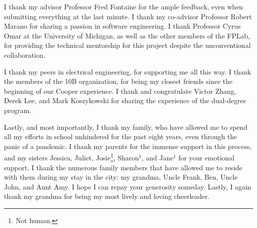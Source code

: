 
\noindent{}I thank my advisor Professor Fred Fontaine for the ample feedback, even when submitting everything at the last minute. I thank my co-advisor Professor Robert Marano for sharing a passion in software engineering. I thank Professor Cyrus Omar at the University of Michigan, as well as the other members of the FPLab, for providing the technical mentorship for this project despite the unconventional collaboration.

I thank my peers in electrical engineering, for supporting me all this way. I thank the members of the 10B organization, for being my closest friends since the beginning of our Cooper experience. I thank and congratulate Victor Zhang, Derek Lee, and Mark Koszykowski for sharing the experience of the dual-degree program.

Lastly, and most importantly, I thank my family, who have allowed me to spend all my efforts in school unhindered for the past eight years, even through the panic of a pandemic. I thank my parents for the immense support in this process, and my sisters Jessica, Juliet, Josie\footnote{Not human.}, Sharon$^1$, and Jane$^1$ for your emotional support. I thank the numerous family members that have allowed me to reside with them during my stay in the city: my grandma, Uncle Frank, Ben, Uncle John, and Aunt Amy. I hope I can repay your generosity someday. Lastly, I again thank my grandma for being my most lively and loving cheerleader.

